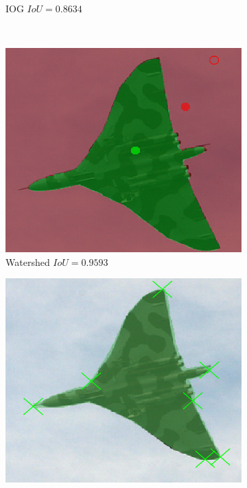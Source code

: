 \begin{figure}
\begin{subfigure}[t]{0.3\textwidth}
{			IOG $ IoU = 0.8634 $
		}
	\end{subfigure}
	\\	
	\begin{subfigure}[t]{0.3\textwidth}
		\centering
		\includegraphics[width=\textwidth]{figures/appendix/method_predictions/jet4_watershed.png}
		\caption{
			Watershed $ IoU = 0.9593 $
		}
	\end{subfigure}
	\hfill
	\begin{subfigure}[t]{0.3\textwidth}
		\centering
		\includegraphics[width=\textwidth]{figures/appendix/method_predictions/jet4_dextr.png}

\end{subfigure}
\end{figure}
